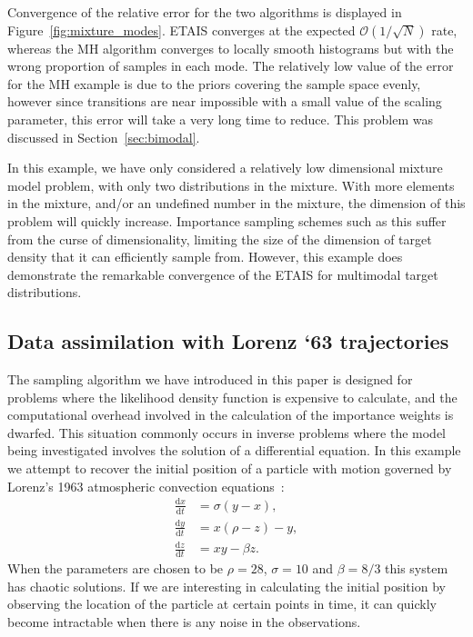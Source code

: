 \documentclass[final]{siamltex}
\begin{document}
Convergence of the relative error for the two algorithms is displayed
in Figure~\ref{fig:mixture_modes}. ETAIS converges at the expected
$\mathcal{O}(1/\sqrt{N})$ rate, whereas the MH algorithm converges to
locally smooth histograms but with the wrong proportion of samples in
each mode. The relatively low value of the error for the MH example is
due to the priors covering the sample space evenly, however since
transitions are near impossible with a small value of the scaling
parameter, this error will take a very long time to reduce. This
problem was discussed in Section~\ref{sec:bimodal}.

In this example, we have only considered a relatively low dimensional
mixture model problem, with only two distributions in the
mixture. With more elements in the mixture, and/or an undefined number
in the mixture, the dimension of this problem will quickly
increase. Importance sampling schemes such as this suffer from the
curse of dimensionality, limiting the size of the dimension of target
density that it can efficiently sample from. However, this example
does demonstrate the remarkable convergence of the ETAIS for multimodal
target distributions.

\subsection{Data assimilation with Lorenz `63 trajectories}\label{sec:lorenz}

The sampling algorithm we have introduced in this paper is designed for problems where the likelihood density function is expensive to calculate, and the computational overhead involved in the calculation of the importance weights is dwarfed. This situation commonly occurs in inverse problems where the model being investigated involves the solution of a differential equation. In this example we attempt to recover the initial position of a particle with motion governed by Lorenz's 1963 atmospheric convection equations~\cite{lorenz1963deterministic}:
\begin{align*}
	\frac{\text{d}x}{\text{d}t} &= \sigma(y-x), \\
	\frac{\text{d}y}{\text{d}t} &= x(\rho-z)-y, \\
	\frac{\text{d}z}{\text{d}t} &= xy - \beta z.
\end{align*}
When the parameters are chosen to be $\rho = 28$, $\sigma=10$ and $\beta=8/3$ this system has chaotic solutions. If we are interesting in calculating the initial position by observing the location of the particle at certain points in time, it can quickly become intractable when there is any noise in the observations.
\end{document}

